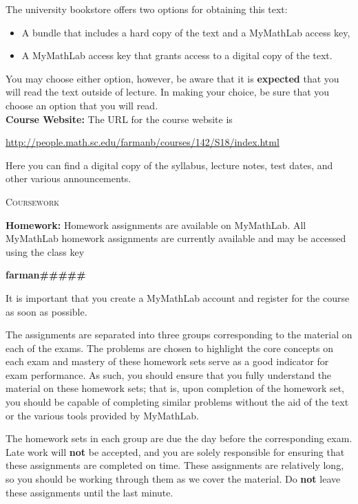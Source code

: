 \documentclass[teaching.portfolio.tex]{subfiles}
\begin{document}
\noindent
The university bookstore offers two options for obtaining this text:
\begin{itemize}
\item
  A bundle that includes a hard copy of the text and a MyMathLab access key,
\item
  A MyMathLab access key that grants access to a digital copy of the text.
\end{itemize}
You may choose either option, however, be aware that it is {\bf expected} that you will read the text outside of lecture.
In making your choice, be sure that you choose an option that you will read.\\

\noindent\textbf{Course Website:} The URL for the course website is
\begin{center}
  \url{http://people.math.sc.edu/farmanb/courses/142/S18/index.html}
\end{center}
Here you can find a digital copy of the syllabus, lecture notes, test dates, and other various announcements.

\begin{center}
  \textsc{Coursework}
\end{center}
\noindent
\textbf{Homework:}
Homework assignments are available on MyMathLab.
All MyMathLab homework assignments are currently available and may be accessed using the class key
\begin{center}
  {\bf farman\#\#\#\#\#}
\end{center}
It is important that you create a MyMathLab account and register for the course as soon as possible.

The assignments are separated into three groups corresponding to the material on each of the exams.
The problems are chosen to highlight the core concepts on each exam and mastery of these homework sets serve as a good indicator for exam performance.
As such, you should ensure that you fully understand the material on these homework sets; that is, upon completion of the homework set, you should be capable of completing similar problems without the aid of the text or the various tools provided by MyMathLab.

The homework sets in each group are due the day before the corresponding exam.
Late work will {\bf not} be accepted, and you are solely responsible for ensuring that these assignments are completed on time.
These assignments are relatively long, so you should be working through them as we cover the material.
Do {\bf not} leave these assignments until the last minute.\\
\end{document}
